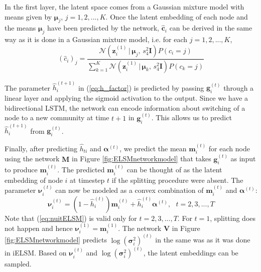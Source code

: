 \documentclass[letterpaper]{article} %
\begin{document}
In the first layer, the latent space comes from a Gaussian mixture model with means given by $\bm{\mu}_j$, $j = 1, 2, ..., {K}$. Once the latent embedding of each node and the means $\bm{\mu}_j$ have been predicted by the network, $\mathbf{\hat{c}}_i$ can be derived in the same way as it is done in a Gaussian mixture model, i.e. for each $j = 1, 2, ..., {K}$,
\begin{equation}
	\label{eq:ciELSM}
	(\hat{c}_i)_j = \frac{\mathcal{N}(\mathbf{z}_i^{(1)}\, |\, \bm{\mu}_j,\, {s_4^2}\mathbf{I}) P({c_i} = j)}{\sum_{k=1}^{{K}} \mathcal{N}(\mathbf{z}_i^{(1)}\, |\, \bm{\mu}_k,\, {s_4^2}\mathbf{I}) P({c_k} = j)}  
\end{equation} 

The parameter $\hat{h}^{(t+1)}_{i}$ in (\ref{eq:h_factor}) is predicted by passing $\mathbf{g}_i^{(t)}$ through a linear layer and applying the sigmoid activation to the output. Since we have a bidirectional LSTM, the  network can encode information about switching of a node to a new community at time $t + 1$ in $\mathbf{g}_i^{(t)}$. This allows us to predict $\hat{h}^{(t+1)}_{i}$ from $\mathbf{g}_i^{(t)}$.

Finally, after predicting $\hat{h}_{ti}$ and $\bm{\alpha}^{(t)}$, we predict the mean $\mathbf{m}_i^{(t)}$ for each node using the network $\mathbf{M}$ in Figure \ref{fig:ELSMnetworkmodel} that takes $\mathbf{g}_i^{(t)}$ as input to produce $\mathbf{m}_i^{(t)}$. The predicted $\mathbf{m}_i^{(t)}$ can be thought of as the latent embedding of node ${i}$ at timestep ${t}$ if the splitting procedure were absent. The parameter $\bm{\nu}_i^{(t)}$ can now be modeled as a convex combination of $\mathbf{m}_i^{(t)}$ and $\bm{\alpha}^{(t)}$:
\begin{equation}
	\label{eq:nuitELSM}
	\bm{\nu}_i^{(t)} = (1-\hat{h}^{(t)}_{i}) \mathbf{m}_i^{(t)} + \hat{h}^{(t)}_{i}\bm{\alpha}^{(t)}, \,\,\,\, t = 2, 3, ..., {T}
\end{equation}
Note that (\ref{eq:nuitELSM}) is valid only for $t = 2, 3, ..., {T}$. For $t=1$, splitting does not happen and hence $\bm{\nu}_i^{(1)} = \mathbf{m}_i^{(1)}$. The network $\mathbf{V}$ in Figure \ref{fig:ELSMnetworkmodel} predicts $\log (\bm{\sigma}_i^2)^{(t)}$ in the same was as it was done in iELSM.  Based on $\bm{\nu}_i^{(t)}$ and $\log (\bm{\sigma}_i^2)^{(t)}$, the latent embeddings can be sampled.

\iffalse
\end{document}
